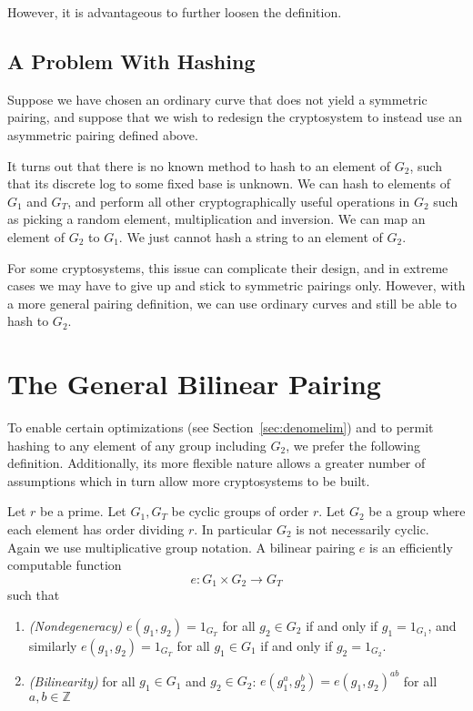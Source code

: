 However, it is advantageous to further loosen the
definition.

\subsection{A Problem With Hashing}

Suppose we have chosen an ordinary curve that does not yield a symmetric
pairing, and suppose that we wish to redesign
the cryptosystem to instead use an asymmetric pairing defined above.

It turns out that there is no
known method to hash to an element of $G_2$, such that
its discrete log to some fixed base is unknown. We can hash to elements of
$G_1$ and $G_T$, and perform all other cryptographically useful
operations in $G_2$ such as picking a random element, multiplication
and inversion. We can map an element of $G_2$ to $G_1$.
We just cannot hash a string to an element of $G_2$.

For some cryptosystems, this issue can complicate their design,
and in extreme cases we may have to give up and stick to symmetric pairings
only.
However, with a more general pairing definition, we can use ordinary curves
and still be able to hash to $G_2$.

\section{\label{sec:generalpairing}The General Bilinear Pairing}

To enable certain optimizations (see Section~\ref{sec:denomelim}) and
to permit hashing to any element of any group including $G_2$,
we prefer the following definition. Additionally, its more flexible nature
allows a greater number of assumptions which in turn allow more
cryptosystems to be built.

Let $r$ be a prime.
Let $G_1, G_T$ be cyclic groups of order $r$.
Let $G_2$ be a group where each element has order dividing $r$.
In particular $G_2$ is not necessarily cyclic.
Again we use multiplicative group notation.
A bilinear pairing $e$ is an efficiently computable function
\[
e:G_1 \times G_2 \rightarrow G_T
\]
such that
\begin{enumerate}
\item
\emph{(Nondegeneracy)}
$e(g_1,g_2) = 1_{G_T}$ for all $g_2 \in G_2$ if and only if $g_1 = 1_{G_1}$,
and similarly 
$e(g_1,g_2) = 1_{G_T}$ for all $g_1 \in G_1$ if and only if $g_2 = 1_{G_2}$.
\item
\emph{(Bilinearity)}
for all $g_1 \in G_1$ and $g_2 \in G_2$:
$e(g_1^a, g_2^b) = e(g_1,g_2)^{a b}$ for all $a, b \in \mathbb{Z}$
\end{enumerate}

